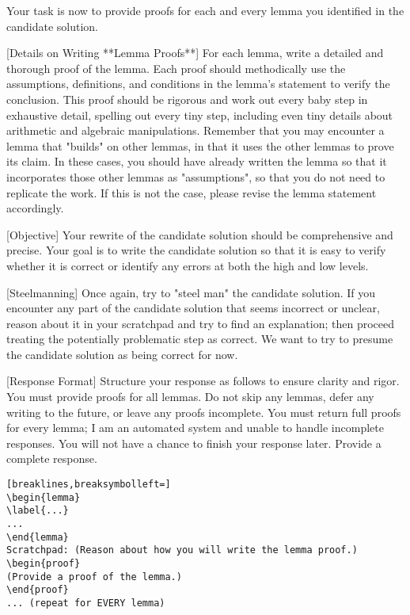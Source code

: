\begin{tcolorbox}[breakable,title=Verification Prompt 3]
Your task is now to provide proofs for each and every lemma you identified in the candidate solution.

[Details on Writing **Lemma Proofs**]
For each lemma, write a detailed and thorough proof of the lemma. Each proof should methodically use the assumptions, definitions, and conditions in the lemma's statement to verify the conclusion.
This proof should be rigorous and work out every baby step in exhaustive detail, spelling out every tiny step, including even tiny details about arithmetic and algebraic manipulations.
Remember that you may encounter a lemma that "builds" on other lemmas, in that it uses the other lemmas to prove its claim. In these cases, you should have already written the lemma so that it incorporates those other lemmas as "assumptions", so that you do not need to replicate the work. If this is not the case, please revise the lemma statement accordingly.

[Objective] Your rewrite of the candidate solution should be comprehensive and precise. Your goal is to write the candidate solution so that it is easy to verify whether it is correct or identify any errors at both the high and low levels.

[Steelmanning] Once again, try to "steel man" the candidate solution. If you encounter any part of the candidate solution that seems incorrect or unclear, reason about it in your scratchpad and try to find an explanation; then proceed treating the potentially problematic step as correct. We want to try to presume the candidate solution as being correct for now.

[Response Format] Structure your response as follows to ensure clarity and rigor. You must provide proofs for all lemmas. Do not skip any lemmas, defer any writing to the future, or leave any proofs incomplete. You must return full proofs for every lemma; I am an automated system and unable to handle incomplete responses. You will not have a chance to finish your response later. Provide a complete response.
\begin{Verbatim}[breaklines,breaksymbolleft=]
\begin{lemma}
\label{...}
...
\end{lemma}
Scratchpad: (Reason about how you will write the lemma proof.)
\begin{proof}
(Provide a proof of the lemma.)
\end{proof}
... (repeat for EVERY lemma)
\end{Verbatim}
\end{tcolorbox}

